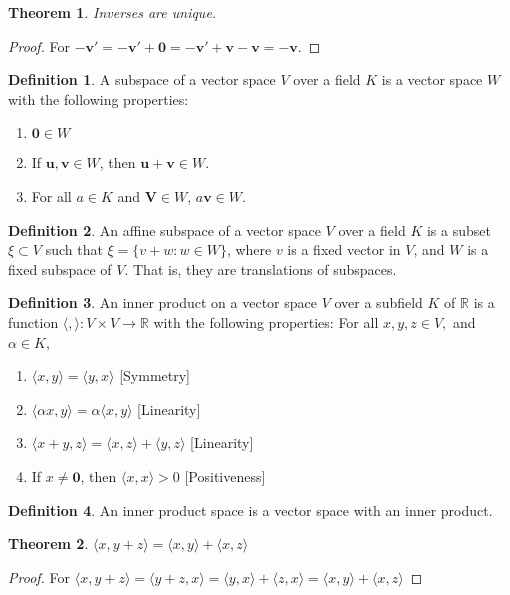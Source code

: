 \documentclass[oneside]{book}
\newtheorem{theorem}{Theorem}[section]
\theoremstyle{definition}
\newtheorem{definition}{Definition}[section]
\newcommand*\B[1]{\mathbf{#1}}
\begin{document}
\begin{theorem}
Inverses are unique.
\end{theorem}
\begin{proof}
For $-\B{v}' = -\B{v}'+\B{0} = -\B{v}'+\B{v}-\B{v} = - \B{v}$.
\end{proof}

\begin{definition}
A subspace of a vector space $V$ over a field $K$ is a vector space $W$ with the following properties:
\begin{enumerate}
\item $\B{0} \in W$
\item If $\B{u,v}\in W$, then $\B{u}+\B{v} \in W$.
\item For all $a\in K$ and $\B{V} \in W$, $a\B{v} \in W$.
\end{enumerate}
\end{definition}

\begin{definition}
An affine subspace of a vector space $V$ over a field $K$ is a subset $\xi\subset V$ such that $\xi = \{v+w:w\in W\}$, where $v$ is a fixed vector in $V$, and $W$ is a fixed subspace of $V$. That is, they are translations of subspaces.
\end{definition}

\begin{definition}
An inner product on a vector space $V$ over a subfield $K$ of $\mathbb{R}$ is a function $\langle , \rangle:V\times V\rightarrow \mathbb{R}$ with the following properties: For all $x,y,z \in V,$ and $\alpha \in K$,
\begin{enumerate}
\item $\langle x,y \rangle = \langle y,x \rangle$ \hfill [Symmetry]
\item $\langle \alpha x, y \rangle = \alpha \langle x,y \rangle$ \hfill [Linearity]
\item $\langle x+y,z \rangle = \langle x,z\rangle + \langle y,z \rangle$ \hfill [Linearity]
\item  If $x\ne \B{0}$, then $\langle x,x\rangle >0$ \hfill [Positiveness]
\end{enumerate}
\end{definition}

\begin{definition}
An inner product space is a vector space with an inner product.
\end{definition}

\begin{theorem}
$\langle x,y+z \rangle = \langle x,y \rangle + \langle x,z \rangle$
\end{theorem}
\begin{proof}
For $\langle x,y+z \rangle = \langle y+z,x \rangle = \langle y,x \rangle + \langle z,x \rangle = \langle x,y \rangle + \langle x,z \rangle$
\end{proof}
\end{document}

